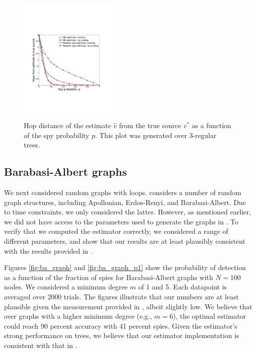 \begin{figure}
\centering
\includegraphics[height = 2.4in]{figures/hops_vs_spies}
\caption{Hop distance of the estimate $\hat v$ from the true source $v^*$ as a function of the spy probability $p$. This plot was generated over 3-regular trees. %
}
\label{fig:hops_vs_spies}
\end{figure}

\subsection{Barabasi-Albert graphs}
We next considered random graphs with loops. \cite{pinto} considers a number of random graph structures, including Apollonian, Erdos-Renyi, and Barabasi-Albert. Due to time constraints, we only considered the latter. However, as mentioned earlier, we did not have access to the parameters used to generate the graphs in \cite{pinto}. To verify that we computed the estimator correctly, we considered a range of different parameters, and show that our results are at least plausibly consistent with the results provided in \cite{pinto}.

Figures \ref{fig:ba_graph} and \ref{fig:ba_graph_p1} show the probability of detection as a function of the fraction of spies for Barabasi-Albert graphs with $N=100$ nodes. We considered a minimum degree $m$ of 1 and 5. Each datapoint is averaged over 2000 trials. The figures illustrate that our numbers are at least plausible given the measurement provided in \cite{pinto}, albeit slightly low. We believe that over graphs with a higher minimum degree (e.g., $m=6$), the optimal estimator could reach 90 percent accuracy with 41 percent spies. Given the estimator's strong performance on trees, we believe that our estimator implementation is consistent with that in \cite{pinto}. %

